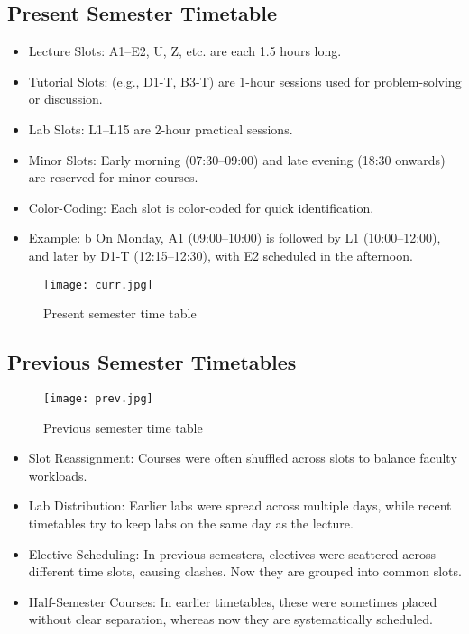 \documentclass[12pt]{article}
\begin{document}
\subsection{Present Semester Timetable}
\begin{itemize}
\item Lecture Slots: A1–E2, U, Z, etc. are each 1.5 hours long.
\item Tutorial Slots: (e.g., D1-T, B3-T) are 1-hour sessions used for problem-solving or discussion.
\item Lab Slots: L1–L15 are 2-hour practical sessions.
\item Minor Slots: Early morning (07:30–09:00) and late evening (18:30 onwards) are reserved for minor courses.
\item Color-Coding: Each slot is color-coded for quick identification.
\item Example: b On Monday, A1 (09:00–10:00) is followed by L1 (10:00–12:00), and later by D1-T (12:15–12:30), with E2 scheduled in the afternoon.

\end{itemize}
\begin{figure}[b]
    \centering
    \texttt{[image: curr.jpg]}
    \caption{Present semester time table}
    \label{fig:placeholder}
\end{figure}
\newpage
\subsection{Previous Semester Timetables}
\begin{figure}[b]
    \centering
    \texttt{[image: prev.jpg]}
    \caption{Previous semester time table}
    \label{fig:placeholder}
\end{figure}
\begin{itemize}
\item Slot Reassignment: Courses were often shuffled across slots to balance faculty workloads.
\item Lab Distribution: Earlier labs were spread across multiple days, while recent timetables try to keep labs on the same day as the lecture.
\item Elective Scheduling: In previous semesters, electives were scattered across different time slots, causing clashes. Now they are grouped into common slots.
\item Half-Semester Courses: In earlier timetables, these were sometimes placed without clear separation, whereas now they are systematically scheduled.
\end{itemize}
\newpage
\end{document}
